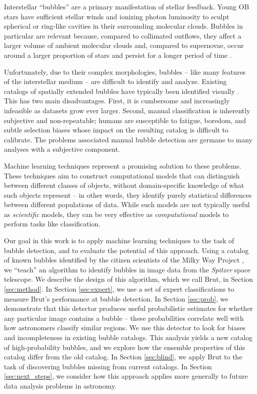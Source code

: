 \documentclass[preprint]{aastex}
\begin{document}
Interstellar ``bubbles'' are a primary manifestation of stellar feedback. Young OB stars have sufficient stellar winds and ionizing photon luminosity to sculpt spherical or ring-like cavities in their surrounding molecular clouds. Bubbles in particular are relevant because, compared to collimated outflows, they affect a larger volume of ambient molecular clouds and, compared to supernovae, occur around a larger proportion of stars and persist for a longer period of time \citep{Matzner02, Arce11}.

Unfortunately, due to their complex morphologies, bubbles -- like many features of the interstellar medium -- are difficult to identify and analyze. Existing catalogs of spatially extended bubbles have typically been identified visually \citep{Churchwell06, Churchwell07, Simpson12, Helfand06}. This has two main disadvantages. First, it is cumbersome and increasingly infeasible as datasets grow ever larger. Second, manual classification is inherently subjective and non-repeatable; humans are susceptible to fatigue, boredom, and subtle selection biases whose impact on the resulting catalog is difficult to calibrate. The problems associated manual bubble detection are germane to many analyses with a subjective component. 

Machine learning techniques represent a promising solution to these problems. These techniques aim to construct computational models that can distinguish between different classes of objects, without domain-specific knowledge of what such objects represent -- in other words, they identify purely statistical differences between different populations of data. While such models are not typically useful as \textit{scientific} models, they can be very effective as \textit{computational} models to perform tasks like classification. 

Our goal in this work is to apply machine learning techniques to the task of bubble detection, and to evaluate the potential of this approach. Using a catalog of known bubbles identified by the citizen scientists of the Milky Way Project \citep{Simpson12}, we ``teach'' an algorithm to identify bubbles in image data from the \textit{Spitzer} space telescope. We describe the design of this algorithm, which we call Brut, in Section \ref{sec:method}. In Section \ref{sec:expert}, we use a set of expert classifications to measure Brut's performance at bubble detection. In Section \ref{sec:prob}, we demonstrate that this detector produces useful probabilistic estimates for whether any particular image contains a bubble -- these probabilities correlate well with how astronomers classify similar regions. We use this detector to look for biases and incompleteness in existing bubble catalogs. This analysis yields a new catalog of high-probability bubbles, and we explore how the ensemble properties of this catalog differ from the old catalog. In Section \ref{sec:blind}, we apply Brut to the task of discovering bubbles missing from current catalogs. In Section \ref{sec:next_steps}, we consider how this approach applies more generally to future data analysis problems in astronomy.
\end{document}

